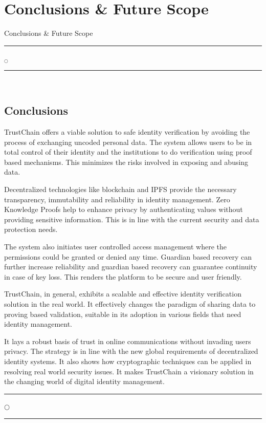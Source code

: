 \chapter[Conclusions \& Future Scope]{Conclusions \& Future Scope}{Conclusions \& Future Scope}\label{res}

\noindent
\rule{0.49\textwidth}{0.75pt} $_{\bigcirc}$ \rule{0.49\textwidth}{0.75pt}\\
\section{Conclusions}
TrustChain offers a viable solution to safe identity verification by avoiding the process of exchanging uncoded personal data. The system allows users to be in total control of their identity and the institutions to do verification using proof based mechanisms. This minimizes the risks involved in exposing and abusing data.

Decentralized technologies like blockchain and IPFS provide the necessary transparency, immutability and reliability in identity management. Zero Knowledge Proofs help to enhance privacy by authenticating values without providing sensitive information. This is in line with the current security and data protection needs.

The system also initiates user controlled access management where the permissions could be granted or denied any time. Guardian based recovery can further increase reliability and guardian based recovery can guarantee continuity in case of key loss. This renders the platform to be secure and user friendly.

TrustChain, in general, exhibits a scalable and effective identity verification solution in the real world. It effectively changes the paradigm of sharing data to proving based validation, suitable in its adoption in various fields that need identity management.

It lays a robust basis of trust in online communications without invading users privacy. The strategy is in line with the new global requirements of decentralized identity systems. It also shows how cryptographic techniques can be applied in resolving real world security issues. It makes TrustChain a visionary solution in the changing world of digital identity management.
\noindent
\begin{center}
\rule{0.45\textwidth}{0.75pt} \; $\bigcirc$ \; \rule{0.45\textwidth}{0.75pt}
\end{center}

